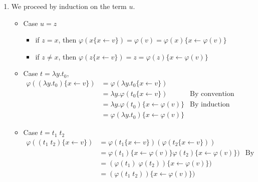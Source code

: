      \begin{enumerate}
        \item We proceed by induction on the term $u$.

          \begin{itemize}
            \item Case $u = z$
              \begin{itemize}
                \item if $z = x$, then
                  $\varphi(x\{x \leftarrow v\}) = \varphi(v) = \varphi(x)\{x
                  \leftarrow \varphi(v)\}$
                \item if $z \not = x$, then
                  $\varphi(z\{x \leftarrow v\}) = z = \varphi(z)\{x
                  \leftarrow \varphi(v)\}$
              \end{itemize}

            \item Case $t = \lambda y. t_0$,
              \begin{align*}
                \varphi((\lambda y. t_0)\{x \leftarrow v\})
                &= \varphi(\lambda y. t_0\{x \leftarrow v\}) \\
                &= \lambda y. \varphi(t_0\{x \leftarrow v\}) & \text{By
                convention} \\
                &= \lambda y. \varphi(t_0)\{x\leftarrow \varphi(v)\} & \text{By
                induction hypothesis} \\
                &= \varphi(\lambda y.t_0)\{x\leftarrow \varphi(v)\}
              \end{align*}

            \item Case $t = t_1\;t_2$
              \begin{align*}
                \varphi((t_1\;t_2)\{x \leftarrow v\})
                &= \varphi(t_1\{x \leftarrow v\}) (\varphi(t_2\{x \leftarrow v\})) \\
                &= \varphi(t_1)\{x \leftarrow \varphi(v)\} \varphi(t_2)\{x
                  \leftarrow \varphi(v)\}) & \text{By induction hypothesis}\\
                &= (\varphi(t_1)\;\varphi(t_2)) \{x \leftarrow \varphi(v)\}) \\
                &= (\varphi(t_1\;t_2)) \{x \leftarrow \varphi(v)\}) \\
              \end{align*}


\end{itemize}
\end{enumerate}
